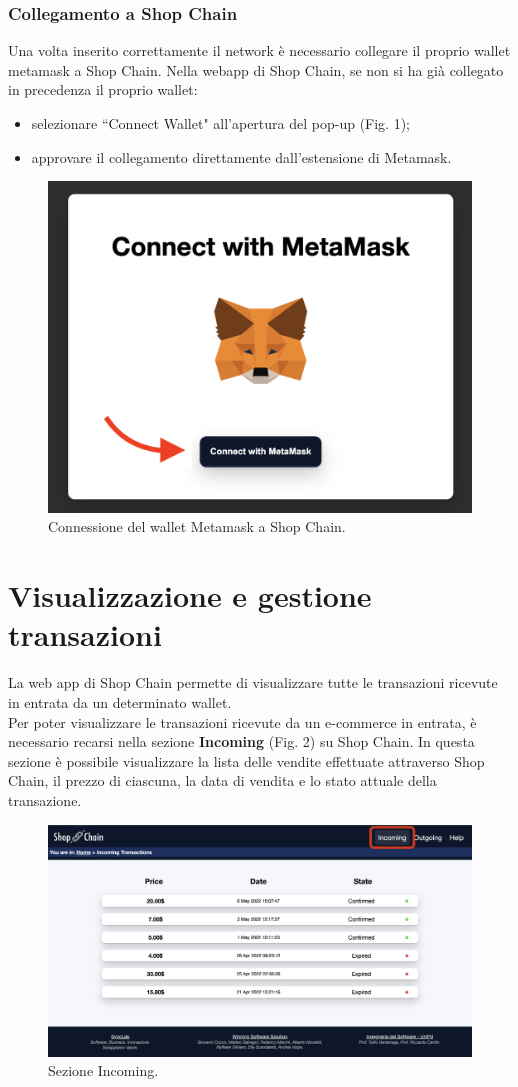 \documentclass[a4paper, 12pt]{article}
\begin{document}
\subsubsection{Collegamento a Shop Chain}
Una volta inserito correttamente il network è necessario collegare il proprio wallet metamask a Shop Chain. Nella webapp di Shop Chain, se non si ha già collegato in precedenza il proprio wallet:
\begin {itemize}
\item selezionare ``Connect Wallet" all'apertura del pop-up (Fig. 1);
\item approvare il collegamento direttamente dall'estensione di Metamask.
\end{itemize}

\FloatBarrier
\begin{figure}[!h]
\centering
\includegraphics[width=0.5\linewidth]{img/connessione_wallet.png}
\caption{Connessione del wallet Metamask a Shop Chain.}
\end{figure}
\FloatBarrier

\section{Visualizzazione e gestione transazioni}
La web app di Shop Chain permette di visualizzare tutte le transazioni ricevute in entrata da un determinato wallet.\\
Per poter visualizzare le transazioni ricevute da un e-commerce in entrata, è necessario recarsi nella sezione \textbf{Incoming} (Fig. 2) su Shop Chain. In questa sezione è possibile visualizzare la lista delle vendite effettuate attraverso Shop Chain, il prezzo di ciascuna, la data di vendita e lo stato attuale della transazione.
\FloatBarrier
\begin{figure}[!h]
\centering
\includegraphics[width=0.8\linewidth]{img/incoming.png}
\caption{Sezione Incoming.}
\end{figure}
\FloatBarrier
\end{document}
